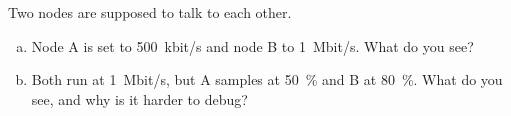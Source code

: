 \label{ex:5:4}
Two nodes are supposed to talk to each other.
\begin{enumerate}[a)]
  \item Node A is set to 500~kbit/s and node B to 1~Mbit/s. What do you see?
  \item Both run at 1~Mbit/s, but A samples at 50~\% and B at 80~\%. What do you see, and why is it
    harder to debug?
\end{enumerate}
